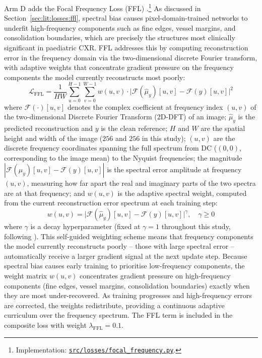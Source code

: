 \documentclass[12pt, a4paper, twoside, openright]{book}
\begin{document}
Arm D adds the Focal Frequency Loss (FFL) \cite{jiang_focal_2021}.\footnote{Implementation: \href{https://github.com/teklesam/ppva_hformer_codebase/blob/main/src/losses/focal_frequency.py}{\texttt{src/losses/focal\_frequency.py}}.} As discussed in
Section~\ref{sec:lit:losses:ffl}, spectral bias \cite{rahaman_spectral_2019} causes
pixel-domain-trained networks to underfit high-frequency components such as fine edges, vessel
margins, and consolidation boundaries, which are precisely the structures most clinically significant
in paediatric CXR. FFL addresses this by computing reconstruction error in the frequency
domain via the two-dimensional discrete Fourier transform, with adaptive weights that
concentrate gradient pressure on the frequency components the model currently reconstructs
most poorly:
\begin{equation}
\label{eq:methods:ffl}
\mathcal{L}_{\mathrm{FFL}}
  = \frac{1}{HW}\sum_{u=0}^{H-1}\sum_{v=0}^{W-1}
    w(u,v)\cdot\bigl|\mathcal{F}(\hat{\mu}_y)[u,v] - \mathcal{F}(y)[u,v]\bigr|^2
\end{equation}
where $\mathcal{F}(\cdot)[u,v]$ denotes the complex coefficient at frequency index
$(u,v)$ of the two-dimensional Discrete Fourier Transform (2D-DFT) of an image;
$\hat{\mu}_y$ is the predicted reconstruction and $y$ is the clean reference; $H$ and
$W$ are the spatial height and width of the image ($256$ and $256$ in this study);
$(u,v)$ are the discrete frequency coordinates spanning the full spectrum from DC
($(0,0)$, corresponding to the image mean) to the Nyquist frequencies; the magnitude
$|\mathcal{F}(\hat{\mu}_y)[u,v] - \mathcal{F}(y)[u,v]|$ is the spectral error amplitude
at frequency $(u,v)$, measuring how far apart the real and imaginary parts of the two
spectra are at that frequency; and $w(u,v)$ is the adaptive spectral weight, computed
from the current reconstruction error spectrum at each training step:
\begin{equation}
\label{eq:methods:ffl_weight}
w(u,v) = \bigl|\mathcal{F}(\hat{\mu}_y)[u,v] - \mathcal{F}(y)[u,v]\bigr|^{\gamma},
\quad \gamma \geq 0
\end{equation}
where $\gamma$ is a decay hyperparameter (fixed at $\gamma = 1$ throughout this study,
following \citeauthor{jiang_focal_2021} \cite{jiang_focal_2021}). This self-guided
weighting scheme means that frequency components the model currently reconstructs poorly
-- those with large spectral error -- automatically receive a larger gradient signal at
the next update step. Because spectral bias causes early training to prioritise low-frequency
components, the weight matrix $w(u,v)$ concentrates gradient pressure on high-frequency
components (fine edges, vessel margins, consolidation boundaries) exactly when they are
most under-recovered. As training progresses and high-frequency errors are corrected, the
weights redistribute, providing a continuous adaptive curriculum over the frequency
spectrum. The FFL term is included in the composite loss with weight $\lambda_{\mathrm{FFL}} = 0.1$.
\end{document}
